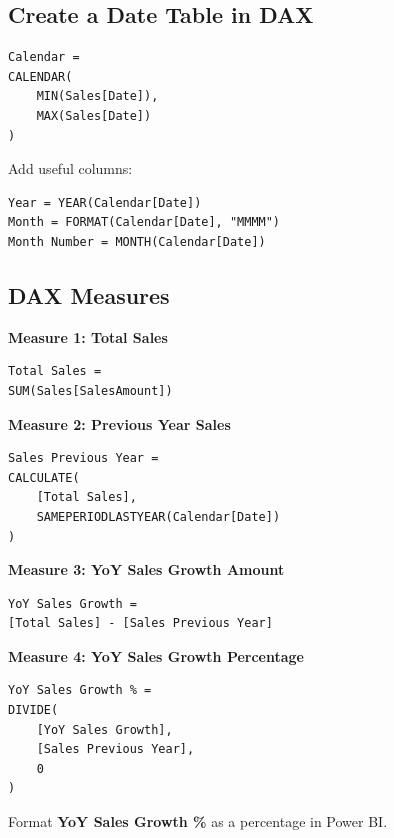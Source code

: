 \documentclass[11pt]{article}
\begin{document}
\subsection{Create a Date Table in DAX}
\begin{lstlisting}[style=daxstyle]
Calendar =
CALENDAR(
    MIN(Sales[Date]),
    MAX(Sales[Date])
)
\end{lstlisting}

Add useful columns:
\begin{lstlisting}[style=daxstyle]
Year = YEAR(Calendar[Date])
Month = FORMAT(Calendar[Date], "MMMM")
Month Number = MONTH(Calendar[Date])
\end{lstlisting}

\subsection{DAX Measures}
\textbf{Measure 1: Total Sales}
\begin{lstlisting}[style=daxstyle]
Total Sales =
SUM(Sales[SalesAmount])
\end{lstlisting}

\textbf{Measure 2: Previous Year Sales}
\begin{lstlisting}[style=daxstyle]
Sales Previous Year =
CALCULATE(
    [Total Sales],
    SAMEPERIODLASTYEAR(Calendar[Date])
)
\end{lstlisting}

\textbf{Measure 3: YoY Sales Growth Amount}
\begin{lstlisting}[style=daxstyle]
YoY Sales Growth =
[Total Sales] - [Sales Previous Year]
\end{lstlisting}

\textbf{Measure 4: YoY Sales Growth Percentage}
\begin{lstlisting}[style=daxstyle]
YoY Sales Growth % =
DIVIDE(
    [YoY Sales Growth],
    [Sales Previous Year],
    0
)
\end{lstlisting}

Format \textbf{YoY Sales Growth \%} as a percentage in Power BI.
\end{document}
